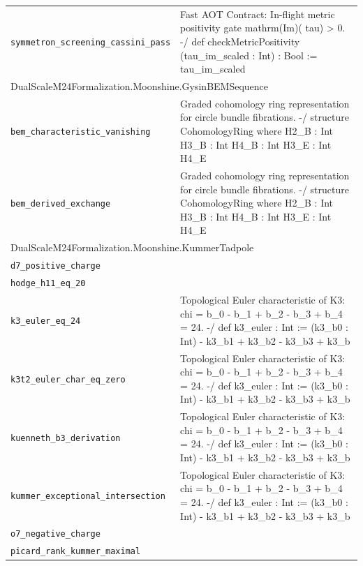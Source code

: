 \begin{longtable}{p{}p{}}
\quad\texttt{\footnotesize symmetron\_screening\_cassini\_pass} & {\footnotesize Fast AOT Contract: In-flight metric positivity gate  mathrm(Im)( tau) > 0. -/ def checkMetricPositivity (tau\_im\_scaled : Int) : Bool := tau\_im\_scaled } \\
\multicolumn{2}{l}{\textsf{\small DualScaleM24Formalization.Moonshine.GysinBEMSequence}} \\
\quad\texttt{\footnotesize bem\_characteristic\_vanishing} & {\footnotesize Graded cohomology ring representation for circle bundle fibrations. -/ structure CohomologyRing where H2\_B : Int H3\_B : Int H4\_B : Int H3\_E : Int H4\_E} \\
\quad\texttt{\footnotesize bem\_derived\_exchange} & {\footnotesize Graded cohomology ring representation for circle bundle fibrations. -/ structure CohomologyRing where H2\_B : Int H3\_B : Int H4\_B : Int H3\_E : Int H4\_E} \\
\multicolumn{2}{l}{\textsf{\small DualScaleM24Formalization.Moonshine.KummerTadpole}} \\
\quad\texttt{\footnotesize d7\_positive\_charge} & {\footnotesize } \\
\quad\texttt{\footnotesize hodge\_h11\_eq\_20} & {\footnotesize } \\
\quad\texttt{\footnotesize k3\_euler\_eq\_24} & {\footnotesize Topological Euler characteristic of K3:  chi = b\_0 - b\_1 + b\_2 - b\_3 + b\_4 = 24. -/ def k3\_euler : Int := (k3\_b0 : Int) - k3\_b1 + k3\_b2 - k3\_b3 + k3\_b} \\
\quad\texttt{\footnotesize k3t2\_euler\_char\_eq\_zero} & {\footnotesize Topological Euler characteristic of K3:  chi = b\_0 - b\_1 + b\_2 - b\_3 + b\_4 = 24. -/ def k3\_euler : Int := (k3\_b0 : Int) - k3\_b1 + k3\_b2 - k3\_b3 + k3\_b} \\
\quad\texttt{\footnotesize kuenneth\_b3\_derivation} & {\footnotesize Topological Euler characteristic of K3:  chi = b\_0 - b\_1 + b\_2 - b\_3 + b\_4 = 24. -/ def k3\_euler : Int := (k3\_b0 : Int) - k3\_b1 + k3\_b2 - k3\_b3 + k3\_b} \\
\quad\texttt{\footnotesize kummer\_exceptional\_intersection} & {\footnotesize Topological Euler characteristic of K3:  chi = b\_0 - b\_1 + b\_2 - b\_3 + b\_4 = 24. -/ def k3\_euler : Int := (k3\_b0 : Int) - k3\_b1 + k3\_b2 - k3\_b3 + k3\_b} \\
\quad\texttt{\footnotesize o7\_negative\_charge} & {\footnotesize } \\
\quad\texttt{\footnotesize picard\_rank\_kummer\_maximal} & {\footnotesize } \\

\end{longtable}
